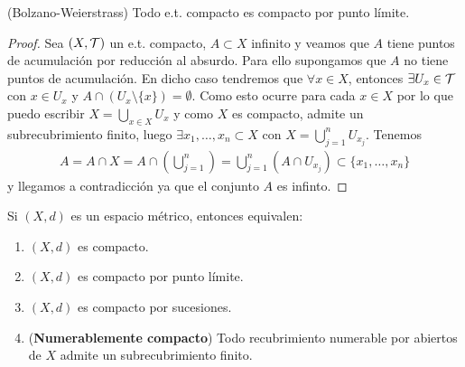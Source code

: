 \begin{prop}
    (Bolzano-Weierstrass) Todo e.t. compacto es compacto por punto límite.
    \begin{proof}
        Sea $(X, \mathcal{T})$ un e.t. compacto, $A\subset X$ infinito y veamos que $A$ tiene puntos de acumulación por reducción al absurdo. Para ello supongamos que $A$ no tiene puntos de acumulación. En dicho caso tendremos que $\forall x \in X$, entonces $\exists U_x\in \mathcal{T}$ con $x\in U_x$ y $A\cap(U_x\setminus \{x\})=\emptyset$. Como esto ocurre para cada $x\in X$ por lo que puedo escribir $X=\bigcup\limits_{x\in X}U_x$ y como $X$ es compacto, admite un subrecubrimiento finito, luego $\exists x_1,\dots,x_n\subset X$ con $X=\bigcup\limits_{j=1}^n U_{x_j}$. Tenemos
        \begin{align*}
            A=A\cap X = A \cap \left(\bigcup\limits_{j=1}^n\right) = \bigcup\limits_{j=1}^n(A\cap U_{x_j})\subset \{x_1,\dots,x_n\}
        \end{align*} 
        y llegamos a contradicción ya que el conjunto $A$ es infinto.

    \end{proof}
\end{prop}

\begin{teo}
    Si $(X, d)$ es un espacio métrico, entonces equivalen:
    \begin{enumerate}
        \item[(i)] $(X, d)$ es compacto.
        \item[(ii)] $(X, d)$ es compacto por punto límite.
        \item[(iii)] $(X, d)$ es compacto por sucesiones.
        \item[(iv)] (\textbf{Numerablemente compacto}) Todo recubrimiento numerable por abiertos de $X$ admite un subrecubrimiento finito.
    \end{enumerate}
\end{teo}

